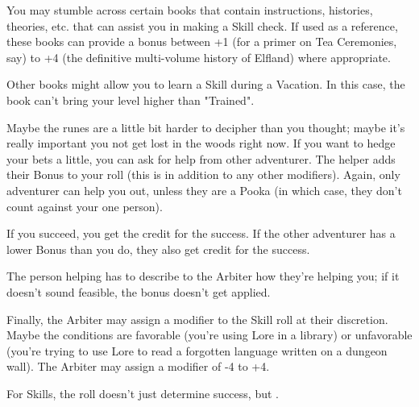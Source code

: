 {   

   You may stumble across certain books that contain instructions, histories, theories, etc. that can assist you in making a Skill check.  If used as a reference, these books can provide a bonus between +1 (for a primer on Tea Ceremonies, say) to +4 (the definitive multi-volume history of Elfland) where appropriate. 

   Other books might allow you to learn a Skill during a Vacation.  In this case, the book can't bring your level higher than "Trained".



  Maybe the runes are a little bit harder to decipher than you thought; maybe it's really important you not get lost in the woods right now.  If you want to hedge your bets a little, you can ask for help from  other adventurer.  The helper adds their Bonus to your roll (this is in addition to any other modifiers).  Again, only  adventurer can help you out, unless they are a Pooka (in which case, they don't count against your one person).

  If you succeed, you get the credit for the success.  If the other adventurer has a lower Bonus than you do, they also get credit for the success.


  The person helping has to describe to the Arbiter how they're helping you; if it doesn't sound feasible, the bonus doesn't get applied.

  Finally, the Arbiter may assign a modifier to the Skill roll at their discretion.  Maybe the conditions are favorable (you're using Lore in a library) or unfavorable (you're trying to use Lore to read a forgotten language written on a dungeon wall).  The Arbiter may assign a modifier of -4 to +4.



  For Skills, the \RO roll doesn't just determine success, but .  

}
